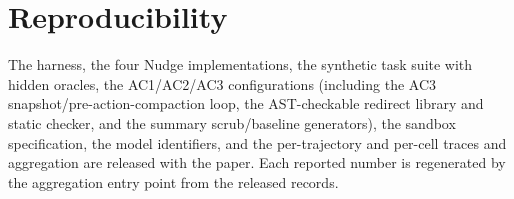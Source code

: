 \documentclass{article}
\theoremstyle{plain}
\theoremstyle{definition}
\begin{document}
\section{Reproducibility}

The harness, the four Nudge implementations, the synthetic task suite with hidden oracles, the AC1/AC2/AC3 configurations (including the AC3 snapshot/pre-action-compaction loop, the AST-checkable redirect library and static checker, and the summary scrub/baseline generators), the sandbox specification, the model identifiers, and the per-trajectory and per-cell traces and aggregation are released with the paper. Each reported number is regenerated by the aggregation entry point from the released records.






\end{document}
